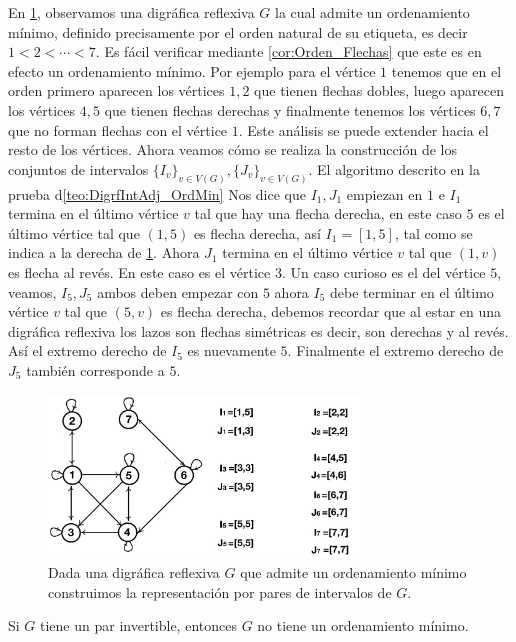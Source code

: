 En \cref{fig:MinOrdToIntGrph}, observamos una digráfica reflexiva $G$ la cual admite un ordenamiento mínimo, definido precisamente por el orden natural de su etiqueta, es decir $1<2< \cdots <7$. Es fácil verificar mediante \cref{cor:Orden_Flechas} que este es en efecto un ordenamiento mínimo. Por ejemplo para el vértice $1$ tenemos que en el orden primero aparecen los vértices $1,2$ que tienen flechas dobles, luego aparecen los vértices $4,5$ que tienen flechas derechas y finalmente tenemos los vértices $6,7$ que no forman flechas con el vértice $1$. Este análisis se puede extender hacia el resto de los vértices.
Ahora veamos cómo se realiza la construcción de los conjuntos de intervalos $\{I_v\}_{v\in V(G)}, \{J_v\}_{v\in V(G)}$. El algoritmo descrito en la prueba  d\cref{teo:DigrfIntAdj_OrdMin} Nos dice que $I_1, J_1$ empiezan en $1$ e $I_1$ termina en el último vértice $v$ tal que hay una flecha derecha, en este caso $5$ es el último vértice tal que $(1,5)$ es flecha derecha, así $I_1=[1,5]$, tal como se indica a la derecha de \cref{fig:MinOrdToIntGrph}. Ahora $J_1$ termina en el último vértice $v$ tal que $(1,v)$ es flecha al revés. En este caso es el vértice $3$. Un caso curioso es el del vértice $5$, veamos, $I_5,J_5$ ambos deben empezar con $5$ ahora $I_5$ debe terminar en el último vértice $v$ tal que $(5,v)$ es flecha derecha, debemos recordar que al estar en una digráfica reflexiva los lazos son flechas simétricas es decir, son derechas y al revés. Así el extremo derecho de $I_5$ es nuevamente $5$. Finalmente el extremo derecho de $J_5$ también corresponde a $5$. 


\begin{figure}[H]
  \centering
  \includegraphics[width=0.75\textwidth]{recursos/capturas/MinOrdToIntGrph.jpg}
  \caption{Dada una digráfica reflexiva $G$ que admite un ordenamiento mínimo construimos la representación por pares de intervalos de $G$.}
  \label{fig:MinOrdToIntGrph}
\end{figure}

\begin{teorema}
    \label{teo:OrnMin_NoInvPair}
    Si $G$ tiene un par invertible, entonces $G$ no tiene un ordenamiento mínimo.
\end{teorema}

